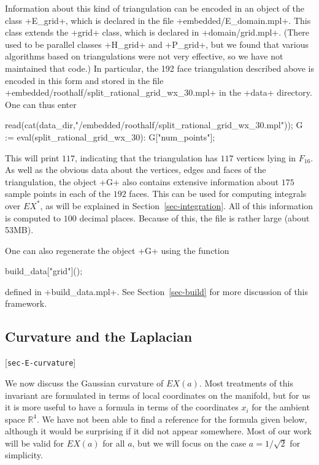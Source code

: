 \documentclass[reqno]{amsart}
\newcommand{\lbl}[1]{\label{#1}\textup{[\texttt{#1}]}\par}
\newcommand{\lbl}{\label}
\newcommand{\R}         {{\mathbb{R}}}
\newcommand{\rt}        {\sqrt{2}}
\renewcommand{\:}{\colon}
\theoremstyle{definition}
\begin{document}
Information about this kind of triangulation can be encoded in an
object of the class \mcode+E_grid+, which is declared in the file
\fname+embedded/E_domain.mpl+.  This class extends the \mcode+grid+
class, which is declared in \fname+domain/grid.mpl+.  (There used to
be parallel classes \mcode+H_grid+ and \mcode+P_grid+, but we found that
various algorithms based on triangulations were not very effective, so
we have not maintained that code.)  In particular, the 192 face
triangulation described above is encoded in this form and stored in
the file
\fname+embedded/roothalf/split_rational_grid_wx_30.mpl+ in the
\mcode+data+ directory.  One can
thus enter
\begin{mcodeblock}
   read(cat(data_dir,"/embedded/roothalf/split_rational_grid_wx_30.mpl"));
   G := eval(split_rational_grid_wx_30):
   G["num_points"];
\end{mcodeblock}
This will print $117$, indicating that the triangulation has $117$
vertices lying in $F_{16}$.  As well as the obvious data about the
vertices, edges and faces of the triangulation, the object \mcode+G+
also contains extensive information about $175$ sample points in each of
the $192$ faces.  This can be used for computing integrals over
$EX^*$, as will be explained in Section~\ref{sec-integration}.  All of
this information is computed to $100$ decimal places.  Because of
this, the file is rather large (about 53MB).

One can also regenerate the object \mcode+G+ using the function
\begin{mcodeblock}
   build_data["grid"]();
\end{mcodeblock}
defined in \fname+build_data.mpl+.  See
Section~\ref{sec-build} for more discussion of this framework. 

\subsection{Curvature and the Laplacian}
\lbl{sec-E-curvature}

We now discuss the Gaussian curvature of $EX(a)$.  Most treatments of
this invariant are formulated in terms of local coordinates on the
manifold, but for us it is more useful to have a formula in terms of
the coordinates $x_i$ for the ambient space $\R^4$.  We have not been
able to find a reference for the formula given below, although it
would be surprising if it did not appear somewhere.  Most of our work
will be valid for $EX(a)$ for all $a$, but we will focus on the case
$a=1/\rt$ for simplicity.
\end{document}
